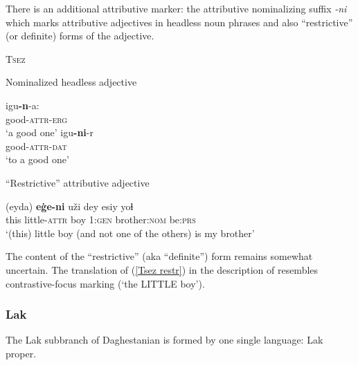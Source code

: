 There is an additional attributive marker: the attributive nominalizing suffix \textit{-ni} which marks attributive adjectives in headless noun phrases and also “restrictive” (or definite) forms of the adjective.
\newpage
\begin{exe}
\ex \textsc{Tsez} \citep{alekseev-etal2004}
\begin{xlist}
\ex	Nominalized headless adjective
\begin{xlist}
\ex
\gll	igu\textbf{-n}-a:\\
	good-\textsc{attr}-\textsc{erg}\\
\glt	‘a good one’
\ex
\gll	igu\textbf{-ni}-r\\
	good-\textsc{attr}-\textsc{dat}\\
\glt	‘to a good one’
\end{xlist}
\ex	“Restrictive” attributive adjective
\begin{xlist}
\ex	\label{Tsez restr}
\gll	(eyda) \textbf{eġe-ni} uži dey esiy yoɬ\\
	this little-\textsc{attr} boy \textsc{1:gen} brother:\textsc{nom} be:\textsc{prs}\\
\glt	‘(this) little boy (and not one of the others) is my brother’
\end{xlist}
\end{xlist}
\end{exe}
The content of the “restrictive” (aka “definite”) form remains somewhat uncertain. The translation of (\ref{Tsez restr}) in the description of \citet[128]{alekseev-etal2004} resembles contrastive-focus marking (‘the LITTLE boy’).

\subsubsection{Lak}
The Lak subbranch of Daghestanian is formed by one single language: Lak proper.

